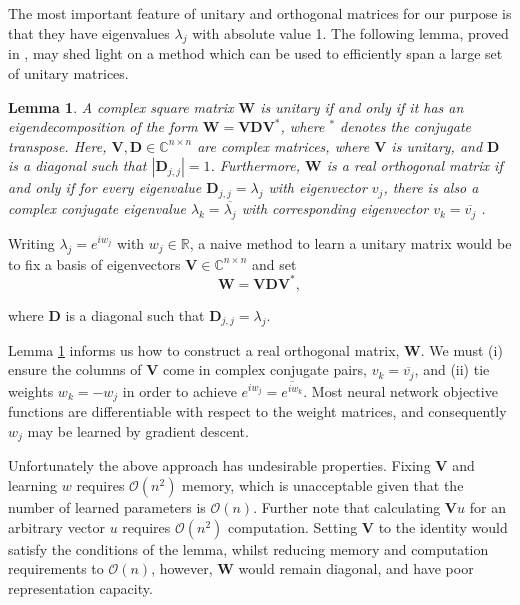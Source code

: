 \documentclass{article} %
\newcommand{\matr}[1]{\mathbf{#1}}
\newcommand\RR{\mathbb{R}}
\newtheorem{lemma}{Lemma}
\begin{document}
The most important feature of unitary and orthogonal matrices for our purpose is that they have eigenvalues
$\lambda_j$ with absolute value 1. The following lemma, proved in \cite{linalgbook}, may shed light on a 
method which can be used to efficiently span a large set of unitary matrices.

\begin{lemma}
  A complex square matrix $\matr{W}$ is unitary if and only if it has an eigendecomposition of the form
  $\matr{W} = \matr{V} \matr{D} \matr{V}^*$, where $^*$ denotes the conjugate transpose.
  Here, $\matr{V}, \matr{D} \in \mathbb{C}^{n \times n}$ are
  complex matrices, where $\matr{V}$ is unitary, and $\matr{D}$ is a diagonal such that $|\matr{D}_{j,j}|=1$. 
  Furthermore, $\matr{W}$ is a real orthogonal matrix if and only if for every eigenvalue $\matr{D}_{j,j} 
  = \lambda_j$ with eigenvector $v_j$, there is also a complex conjugate
  eigenvalue $\lambda_k = \overline{\lambda_j}$ with 
  corresponding eigenvector $v_k = \overline{v_j}$ .
\label{lemma}
\end{lemma}

Writing $\lambda_j = e^{i w_j}$ with $w_j \in \RR$, a naive method to learn a unitary matrix would be to
fix a basis of eigenvectors $\matr{V} \in \mathbb{C}^{n \times n}$ and set
\begin{equation} \matr{W} = \matr{V} \matr{D} \matr{V}^{*} , \end{equation}

where $\matr{D}$ is a diagonal such that $\matr{D}_{j,j} = \lambda_j$. 

Lemma \ref{lemma} informs us how to construct a real orthogonal matrix, $\matr{W}$.
We must (i) ensure the columns of $\matr{V}$ come in complex conjugate pairs, $v_k = \overline{v_j}$, and
(ii) tie weights $w_k=-w_j$ in order to achieve $e^{i w_j} = \overline{e^{i w_k}}$. 
Most neural network objective functions are differentiable with respect to the weight matrices,
and consequently $w_j$ may be learned by gradient descent. 

Unfortunately the above approach has undesirable properties. 
Fixing $\matr{V}$ and learning $w$ requires $\mathcal{O}\left(n^2\right)$ memory, 
which is unacceptable given that the number of learned parameters is $\mathcal{O}(n)$. 
Further note that calculating $\matr{V} u$ for an arbitrary vector $u$ 
requires $\mathcal{O}(n^2)$ computation. 
Setting $\matr{V}$ to the identity would satisfy the conditions of the lemma, whilst reducing  
memory and computation requirements to $\mathcal{O}(n)$, however, $\matr{W}$ would remain diagonal, 
and have poor representation capacity.
\end{document}
